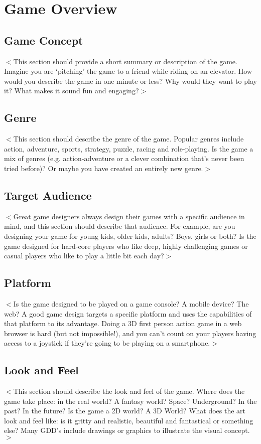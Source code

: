 
\section{Game Overview}

\subsection{Game Concept}
$<$This section should provide a short summary or description of the game. Imagine you are `pitching' the game to a friend while riding on an elevator. How would you describe the game in one minute or less? Why would they want to play it? What makes it sound fun and engaging?$>$
\subsection{Genre}
$<$This section should describe the genre of the game. Popular genres include action, adventure, sports, strategy, puzzle, racing and role-playing. Is the game a mix of genres (e.g. action-adventure or a clever combination that's never been tried before)?  Or maybe you have created an entirely new genre.$>$
\subsection{Target Audience}
$<$Great game designers always design their games with a specific audience in mind, and this section should describe that audience. For example, are you designing your game for young kids, older kids, adults? Boys, girls or both? Is the game designed for hard-core players who like deep, highly challenging games or casual players who like to play a little bit each day?$>$

\subsection{Platform}
$<$Is the game designed to be played on a game console? A mobile device? The web? A good game design targets a specific platform and uses the capabilities of that platform to its advantage. Doing a 3D first person action game in a web browser is hard (but not impossible!), and you can't count on your players having access to a joystick if they're going to be playing on a smartphone.$>$

\subsection{Look and Feel}
$<$This section should describe the look and feel of the game. Where does the game take place: in the real world? A fantasy world? Space? Underground? In the past? In the future? Is the game a 2D world? A 3D World? What does the art look and feel like: is it gritty and realistic, beautiful and fantastical or something else? Many GDD's include drawings or graphics to illustrate the visual concept.$>$

